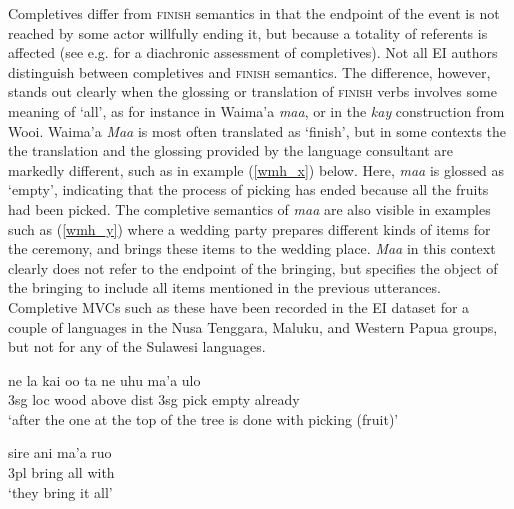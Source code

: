 Completives differ from \textsc{finish} semantics in that the endpoint of the event is not reached by some actor willfully ending it, but because a totality of referents is affected (see e.g. \cite{bybee1994evolution} for a diachronic assessment of completives). Not all EI authors distinguish between completives and \textsc{finish} semantics. The difference, however, stands out clearly when the glossing or translation of \textsc{finish} verbs involves some meaning of `all', as for instance in Waima'a \textit{maa}, or in the  \textit{kay} construction from Wooi. Waima'a \textit{Maa} is most often translated as `finish', but in some contexts the the translation and the glossing provided by the language consultant are markedly different, such as in example (\ref{wmh_x}) below. Here, \textit{maa} is glossed as `empty', indicating that the process of picking has ended because all the fruits had been picked. The completive semantics of \textit{maa} are also visible in examples such as (\ref{wmh_y}) where a wedding party prepares different kinds of items for the ceremony, and brings these items to the wedding place. \textit{Maa} in this context clearly does not refer to the endpoint of the bringing, but specifies the object of the bringing to include all items mentioned in the previous utterances. Completive MVCs such as these have been recorded in the EI dataset for a couple of languages in the Nusa Tenggara, Maluku, and Western Papua groups, but not for any of the Sulawesi languages.

\ea \label{wmh_x}
\gll ne la kai oo ta ne uhu ma'a ulo \\
3\acs{sg} \acs{loc} wood above \acs{dist} 3\acs{sg} pick empty already \\
\glft `after the one at the top of the tree is done with picking (fruit)' \\ 
\z
\xe

\ea \label{wmh_y}
\gll sire ani ma'a  ruo \\
3\acs{pl} bring all with \\
\glft `they bring it all' \\ 
\z
\xe

